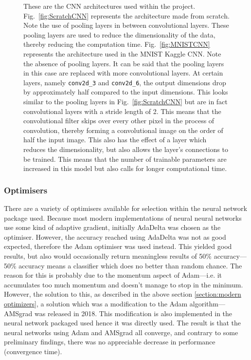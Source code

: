 \documentclass[a4paper,fleqn,usenatbib]{mnras}
\begin{document}
\begin{figure}
\caption{These are the CNN architectures used within the project. Fig.~\ref{fig:ScratchCNN} represents the architecture made from scratch. Note the use of pooling layers in between convolutional layers. These pooling layers are used to reduce the dimensionality of the data, thereby reducing the computation time. Fig.~\ref{fig:MNISTCNN} represents the architecture used in the MNIST Kaggle CNN. Note the absence of pooling layers. It can be said that the pooling layers in this case are replaced with more convolutional layers. At certain layers, namely \texttt{conv2d\_3} and \texttt{conv2d\_6}, the output dimensions drop by approximately half compared to the input dimensions. This looks similar to the pooling layers in Fig.~\ref{fig:ScratchCNN} but are in fact convolutional layers with a stride length of 2. This means that the convolutional filter skips over every other pixel in the process of convolution, thereby forming a convolutional image on the order of half the input image. This also has the effect of a layer which reduces the dimensionality, but also allows the layer's connections to be trained. This means that the number of trainable parameters are increased in this model but also calls for longer computational time. \label{fig:CNNArchitecture}}
 
 \end{figure}

\subsubsection{Optimisers}
There are a variety of optimisers available for selection within the neural network package used. Because most modern implementations of neural neural networks use some kind of adaptive gradient, initially AdaDelta was chosen as the optimiser. However, the accuracy reached using AdaDelta was not as good expected, therefore the Adam optimiser was used instead. This yielded good results, but also would occasionally return meaningless results of 50\% accuracy---50\% accuracy means a classifier which does no better than random chance. The reason for this is probably due to the momentum aspect of Adam---i.e. it accumulates too much momentum and doesn't manage to stop in the minimum. However, the solution to this, as described in the above section \ref{section:modern optimizers}, a solution which was a modification to the Adam algorithm---AMSgrad was released in 2018. This modification is also implemented in the neural network packaged used hence it was directly used. The result is that the neural networks using Adam and AMSgrad all converge, and contrary to some preliminary findings, there was no appreciable decrease in performance (convergence time). 
\end{document}

